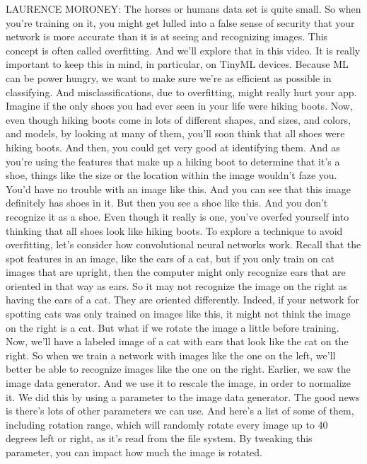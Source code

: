 LAURENCE MORONEY: The horses or humans data set is quite small.
So when you're training on it, you might get
lulled into a false sense of security that your network is
more accurate than it is at seeing and recognizing images.
This concept is often called overfitting.
And we'll explore that in this video.
It is really important to keep this in mind, in particular, on TinyML devices.
Because ML can be power hungry, we want to make
sure we're as efficient as possible in classifying.
And misclassifications, due to overfitting,
might really hurt your app.
Imagine if the only shoes you had ever seen in your life were hiking boots.
Now, even though hiking boots come in lots of different shapes, and sizes,
and colors, and models, by looking at many of them,
you'll soon think that all shoes were hiking boots.
And then, you could get very good at identifying them.
And as you're using the features that make up a hiking
boot to determine that it's a shoe, things
like the size or the location within the image wouldn't faze you.
You'd have no trouble with an image like this.
And you can see that this image definitely has shoes in it.
But then you see a shoe like this.
And you don't recognize it as a shoe.
Even though it really is one, you've overfed yourself
into thinking that all shoes look like hiking boots.
To explore a technique to avoid overfitting,
let's consider how convolutional neural networks work.
Recall that the spot features in an image, like the ears of a cat,
but if you only train on cat images that are upright,
then the computer might only recognize ears
that are oriented in that way as ears.
So it may not recognize the image on the right as having the ears of a cat.
They are oriented differently.
Indeed, if your network for spotting cats
was only trained on images like this, it might not think the image on the right
is a cat.
But what if we rotate the image a little before training.
Now, we'll have a labeled image of a cat with ears
that look like the cat on the right.
So when we train a network with images like the one on the left,
we'll better be able to recognize images like the one on the right.
Earlier, we saw the image data generator.
And we use it to rescale the image, in order to normalize it.
We did this by using a parameter to the image data generator.
The good news is there's lots of other parameters we can use.
And here's a list of some of them, including rotation range,
which will randomly rotate every image up to 40 degrees
left or right, as it's read from the file system.
By tweaking this parameter, you can impact how much the image is rotated.
